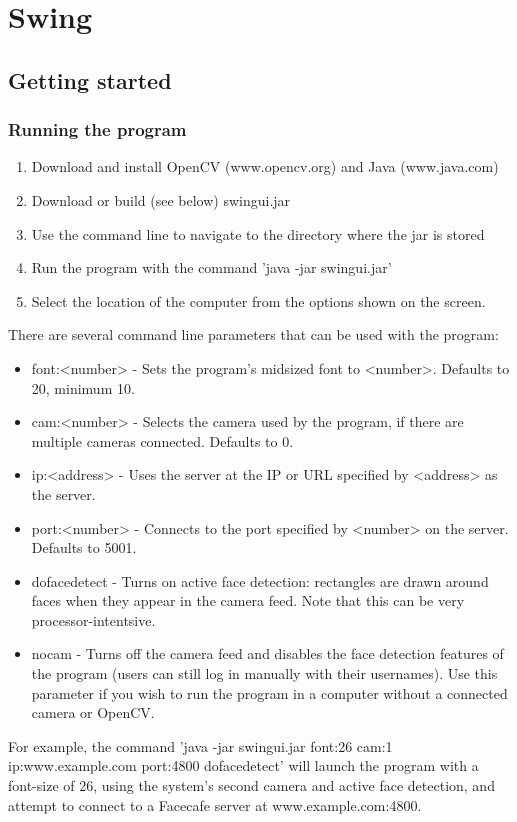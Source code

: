 \documentclass[11pt]{article}
\begin{document}
\section{Swing}
\subsection{Getting started}
\subsubsection*{Running the program}
\begin{enumerate}
\item{Download and install OpenCV (www.opencv.org) and 
Java (www.java.com)}
\item{Download or build (see below) swingui.jar}
\item{Use the command line to navigate to the directory where the jar is stored}
\item{Run the program with the command 'java -jar swingui.jar'}
\item{Select the location of the computer from the options shown on the screen.}
\end{enumerate}
There are several command line parameters that can be used with the program:
\begin{itemize}
\item{font:<number> - Sets the program's midsized font to <number>. Defaults to 20, minimum 10.}
\item{cam:<number> - Selects the camera used by the program, if there are multiple 
cameras connected. Defaults to 0.}
\item{ip:<address> - Uses the server at the IP or URL specified by <address> as the server.}
\item{port:<number> - Connects to the port specified by <number> on the server. Defaults to 5001.}
\item{dofacedetect - Turns on active face detection: rectangles are drawn around faces when they
appear in the camera feed. Note that this can be very processor-intentsive.}
\item{nocam - Turns off the camera feed and disables the face detection features of the program
(users can still log in manually with their usernames). Use this parameter if you wish to run the
program in a computer without a connected camera or OpenCV.}
\end{itemize}
For example, the command 'java -jar swingui.jar font:26 cam:1 
ip:www.example.com port:4800 dofacedetect' will launch the program with a 
font-size of 26, using the system's second camera and active face detection, 
and attempt to connect to a Facecafe server at www.example.com:4800.
\end{document}
